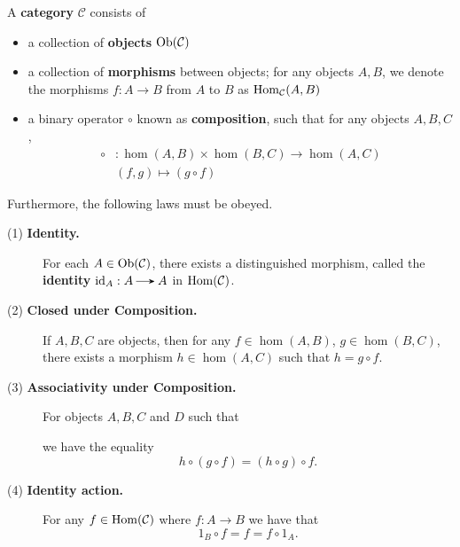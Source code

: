     \begin{definition}
        A \textbf{category} $\mathcal{C}$ consists of 
        \begin{itemize}
            \item a collection of \textbf{objects} $\operatorname{\mathrm{Ob}}(\mathcal{C})$
            \item a collection of \textbf{morphisms} between objects; for any objects $A, B$, 
            we denote the morphisms $f: A \to B$ from $A$ to $B$ as $\operatorname{\mathrm{Hom}}_{\mathcal{C}}(A, B)$
            \item a binary operator $\circ$ known as \textbf{composition}, such that for
            any objects $A,  B, C$, 
            \begin{align*}
                \circ &: \hom(A, B) \times \hom(B, C) \to \hom(A, C)\\
                &(f, g) \mapsto (g \circ f)
            \end{align*}
        \end{itemize}
        Furthermore, the following
        laws must be obeyed.
        \begin{description}
            \item[(1) \textbf{Identity.}] For each $A \in \operatorname{\mathrm{Ob}}(\mathcal{C})$, there exists a distinguished
            morphism, called the \textbf{identity} $\id_A: A \to A$ in $\operatorname{\mathrm{Hom}}(\mathcal{C})$.
            \item[(2) \textbf{Closed under Composition.}] If $A, B, C$ are objects, then for any 
            $f \in \hom(A,B)$, $g \in \hom(B,C)$, there exists a
            morphism $h \in \hom(A, C)$ such that $h = g \circ f$.
            \begin{center}
            \end{center}
            
            \item[(3) \textbf{Associativity under Composition.}] For
            objects $A, B, C$ and $D$ such that  
            \begin{center}
            \end{center}
            we have the equality 
            \[
                h \circ (g \circ f) = (h \circ g) \circ f.
            \]
            \item[(4) \textbf{Identity action.}] For any $f \in
            \operatorname{\mathrm{Hom}}(\mathcal{C})$ where $f:A \to B$ we have that
            \[
                1_B \circ f = f = f \circ 1_A.
            \]
        \end{description}
    \end{definition}

